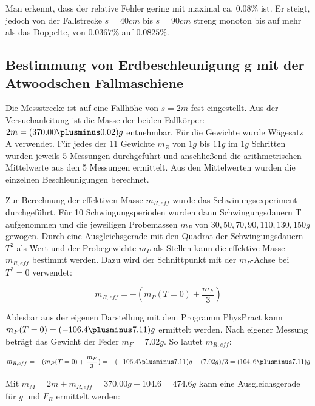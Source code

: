 \documentclass{protokoll}
\begin{document}

Man erkennt, dass der relative Fehler gering mit maximal ca. $0.08 \%$ ist.
Er steigt, jedoch von der Fallstrecke $s = 40cm$ bis $s = 90cm$ streng monoton 
bis auf mehr als das Doppelte, von $0.0367 \%$ auf $0.0825 \%$.


\subsection{Bestimmung von Erdbeschleunigung g mit der Atwoodschen Fallmaschiene}



Die Messstrecke ist auf eine Fallhöhe von $s = 2m$ fest eingestellt. Aus der Versuchanleitung ist die Masse der 
beiden Fallkörper: $2m = (370.00 \plusminus 0.02)g$ entnehmbar. Für die Gewichte wurde Wägesatz A verwendet.
Für jedes der 11 Gewichte $m_Z$ von $1g$ bis $11g$ im $1g$ Schritten wurden jeweils 5 Messungen durchgeführt 
und anschließend die arithmetrischen Mittelwerte aus den 5 Messungen ermittelt. Aus den Mittelwerten wurden 
die einzelnen Beschleunigungen berechnet.

Zur Berechnung der effektiven Masse $m_{R,eff}$ wurde das Schwinungsexperiment durchgeführt.
Für 10 Schwingungsperioden wurden dann Schwingungsdauern T aufgenommen und die jeweiligen
Probemassen $m_P$ von $30, 50, 70, 90, 110, 130, 150g$ gewogen.
Durch eine Ausgleichsgerade mit den Quadrat der Schwingungsdauern $T^2$ als Wert und
der Probegewichte $m_P$ als Stellen kann die effektive Masse $m_{R,eff}$ bestimmt werden.
Dazu wird der Schnittpunkt mit der $m_P$-Achse bei $T^2 = 0$ verwendet:

\begin{equation}
 m_{R,eff} = -(m_P(T=0) + \frac{m_F}{3}) 
\end{equation}



Ablesbar aus der eigenen Darstellung mit dem Programm PhysPract kann $m_P(T=0) = (-106.4 \plusminus 7.11) g$ ermittelt werden.
Nach eigener Messung beträgt das Gewicht der Feder $m_F = 7.02g$.
So lautet $m_{R,eff}$:


\begin{equation}
 m_{R,eff} = -(m_P(T=0) + \frac{m_F}{3}) = - (-106.4 \plusminus 7.11)g - (7.02g)/3 = (104,6 \plusminus 7.11)g 
\end{equation}



Mit $ m_M = 2m + m_{R,eff} = 370.00g + 104.6 = 474.6g$ kann eine Ausgleichsgerade für $g$ und $F_R$ ermittelt werden:
\end{document}
